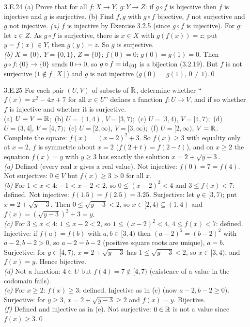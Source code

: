 \begin{bookex}[essential]{3.E.24}
(a) Prove that for all $f:X\to Y$, $g:Y\to Z$: if $g\circ f$ is bijective then $f$ is injective and $g$ is surjective. (b) Find $f,g$ with $g\circ f$ bijective, $f$ not surjective and $g$ not injective.
\solution
\emph{(a)} $f$ is injective by Exercise 3.2.5 (since $g\circ f$ is injective). For $g$: let $z\in Z$. As $g\circ f$ is surjective, there is $x\in X$ with $g(f(x))=z$; put $y=f(x)\in Y$, then $g(y)=z$. So $g$ is surjective.\\
\emph{(b)} $X=\{0\}$, $Y=\{0,1\}$, $Z=\{0\}$; $f(0)=0$; $g(0)=g(1)=0$. Then $g\circ f:\{0\}\to\{0\}$ sends $0\mapsto0$, so $g\circ f=\mathrm{id}_{\{0\}}$ is a bijection (3.2.19). But $f$ is not surjective ($1\notin f[X]$) and $g$ is not injective ($g(0)=g(1)$, $0\ne1$).\qed
\end{bookex}

\begin{bookex}{3.E.25}
For each pair $(U,V)$ of subsets of $\mathbb{R}$, determine whether ``$f(x)=x^2-4x+7$ for all $x\in U$'' defines a function $f:U\to V$, and if so whether $f$ is injective and whether it is surjective.\\
(a) $U=V=\mathbb{R}$;\ (b) $U=(1,4)$, $V=[3,7)$;\ (c) $U=[3,4)$, $V=[4,7)$;\ (d) $U=(3,4]$, $V=[4,7)$;\ (e) $U=[2,\infty)$, $V=[3,\infty)$;\ (f) $U=[2,\infty)$, $V=\mathbb{R}$.
\solution
Complete the square: $f(x)=(x-2)^2+3$. So $f(x)\ge3$ with equality only at $x=2$, $f$ is symmetric about $x=2$ ($f(2+t)=f(2-t)$), and on $x\ge2$ the equation $f(x)=y$ with $y\ge3$ has exactly the solution $x=2+\sqrt{y-3}$.\\
\emph{(a)} Defined (every real $x$ gives a real value). Not injective: $f(0)=7=f(4)$. Not surjective: $0\in V$ but $f(x)\ge3>0$ for all $x$.\\
\emph{(b)} For $1<x<4$: $-1<x-2<2$, so $0\le(x-2)^2<4$ and $3\le f(x)<7$: defined. Not injective: $f(1.5)=f(2.5)=3.25$. Surjective: let $y\in[3,7)$; put $x=2+\sqrt{y-3}$. Then $0\le\sqrt{y-3}<2$, so $x\in[2,4)\subseteq(1,4)$ and $f(x)=(\sqrt{y-3})^2+3=y$.\\
\emph{(c)} For $3\le x<4$: $1\le x-2<2$, so $1\le(x-2)^2<4$, $4\le f(x)<7$: defined. Injective: if $f(a)=f(b)$ with $a,b\in[3,4)$ then $(a-2)^2=(b-2)^2$ with $a-2,b-2>0$, so $a-2=b-2$ (positive square roots are unique), $a=b$. Surjective: for $y\in[4,7)$, $x=2+\sqrt{y-3}$ has $1\le\sqrt{y-3}<2$, so $x\in[3,4)$, and $f(x)=y$. Hence bijective.\\
\emph{(d)} Not a function: $4\in U$ but $f(4)=7\notin[4,7)$ (existence of a value in the codomain fails).\\
\emph{(e)} For $x\ge2$: $f(x)\ge3$: defined. Injective as in (c) (now $a-2,b-2\ge0$). Surjective: for $y\ge3$, $x=2+\sqrt{y-3}\ge2$ and $f(x)=y$. Bijective.\\
\emph{(f)} Defined and injective as in (e). Not surjective: $0\in\mathbb{R}$ is not a value since $f(x)\ge3$.\qed
\end{bookex}

